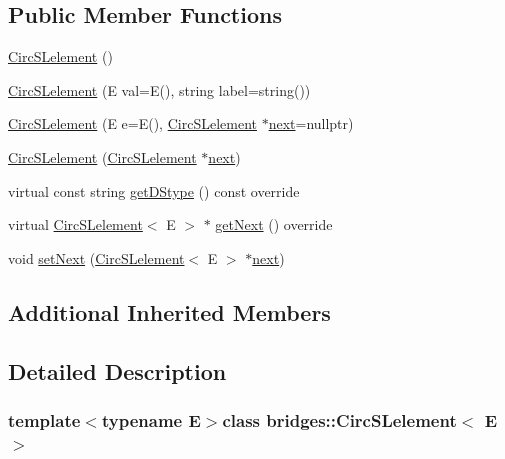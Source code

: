 \subsection*{Public Member Functions}
\begin{DoxyCompactItemize}
\item 
\hyperlink{classbridges_1_1_circ_s_lelement_a86183d3487b906550d8f32bda3a68f98}{Circ\+S\+Lelement} ()
\item 
\hyperlink{classbridges_1_1_circ_s_lelement_a765032df6cfaa7cf7589c9e0df29bae4}{Circ\+S\+Lelement} (E val=E(), string label=string())
\item 
\hyperlink{classbridges_1_1_circ_s_lelement_a0dd7605959b4b52de041e9bcbe5abce7}{Circ\+S\+Lelement} (E e=E(), \hyperlink{classbridges_1_1_circ_s_lelement}{Circ\+S\+Lelement} $\ast$\hyperlink{classbridges_1_1_s_lelement_ad7449d10a09ebc52653a7baed812aa43}{next}=nullptr)
\item 
\hyperlink{classbridges_1_1_circ_s_lelement_a1fda146fc0da1d8c7d6440cbbbb2ce42}{Circ\+S\+Lelement} (\hyperlink{classbridges_1_1_circ_s_lelement}{Circ\+S\+Lelement} $\ast$\hyperlink{classbridges_1_1_s_lelement_ad7449d10a09ebc52653a7baed812aa43}{next})
\item 
virtual const string \hyperlink{classbridges_1_1_circ_s_lelement_a4afcf2593c00f2e1161d85ea31d7ae00}{get\+D\+Stype} () const  override
\item 
virtual \hyperlink{classbridges_1_1_circ_s_lelement}{Circ\+S\+Lelement}$<$ E $>$ $\ast$ \hyperlink{classbridges_1_1_circ_s_lelement_aab863627c125c6f1075af7e7b7f340cf}{get\+Next} () override
\item 
void \hyperlink{classbridges_1_1_circ_s_lelement_a7b2512dd1cc559f0a89d9ab4aafed172}{set\+Next} (\hyperlink{classbridges_1_1_circ_s_lelement}{Circ\+S\+Lelement}$<$ E $>$ $\ast$\hyperlink{classbridges_1_1_s_lelement_ad7449d10a09ebc52653a7baed812aa43}{next})
\end{DoxyCompactItemize}
\subsection*{Additional Inherited Members}


\subsection{Detailed Description}
\subsubsection*{template$<$typename E$>$class bridges\+::\+Circ\+S\+Lelement$<$ E $>$}


